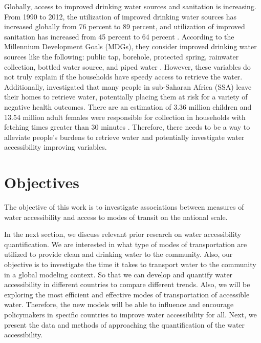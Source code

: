 \documentclass[10pt,twoside]{article}
\numberwithin{equation}{section}
\newcommand{\?}{\stackrel{?}{=}}
\newcommand{\rd}{\color{red}}
\begin{document}
Globally, access to improved drinking water sources and sanitation is increasing. From 1990 to 2012, the utilization of
improved drinking water sources has increased globally from 76 percent to 89 percent, and utilization of improved
sanitation has increased from 45 percent to 64 percent \citep{fuller2016tracking}. According to the Millennium Development Goals (MDGs),
they consider improved drinking water sources like the following: public tap, borehole, protected spring, rainwater
collection, bottled water source, and piped water \citep{bartram2014global}. However, these variables do not truly
explain if the households have speedy access to retrieve the water. Additionally, \citet{grahamAnalysisWaterCollection2016} investigated that many people in sub-Saharan Africa (SSA) leave their homes to retrieve water, potentially placing them at risk for a variety of negative health outcomes. There are an estimation of 3.36 million children and 13.54 million adult females were responsible for collection in households with fetching times greater than 30 minutes \citep{grahamAnalysisWaterCollection2016}. Therefore, there needs to be a way to alleviate people's burdens to retrieve water and potentially investigate water accessibility improving variables. 



\section{Objectives}
The objective of this work is to  investigate associations between measures of water accessibility and access to modes of transit on the national scale. 

In the next section, we discuss relevant prior research on water accessibility quantification. We are interested in what type of modes of
transportation are utilized to provide clean and drinking water to the community. Also, our objective is to investigate
the time it takes to transport water to the community in a global modeling context. So that we can develop and quantify
water accessibility in different countries to compare different trends. Also, we will be exploring the most efficient
and effective modes of transportation of accessible water. Therefore, the new models will be able to influence and
encourage policymakers in specific countries to improve water accessibility for all. Next, we present the data and methods of approaching the quantification of the water accessibility. 
 
\end{document}
